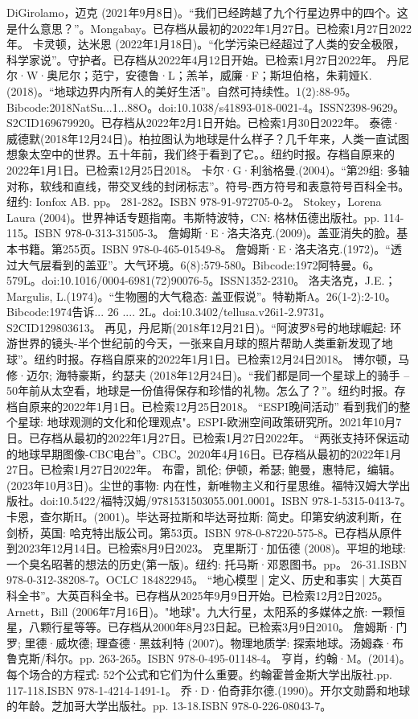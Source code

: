 \begin{enumerate}
 DiGirolamo，迈克 (2021年9月8日)。“我们已经跨越了九个行星边界中的四个。这是什么意思？”。Mongabay。已存档从最初的2022年1月27日。已检索1月27日2022年。
 卡灵顿，达米恩 (2022年1月18日)。“化学污染已经超过了人类的安全极限，科学家说”。守护者。已存档从2022年4月12日开始。已检索1月27日2022年。
 丹尼尔·W·奥尼尔；范宁，安德鲁·L；羔羊，威廉·F；斯坦伯格，朱莉娅K.(2018)。“地球边界内所有人的美好生活”。自然可持续性。1(2):88-95。Bibcode:2018NatSu...1...88O。doi:10.1038/s41893-018-0021-4。ISSN2398-9629。S2CID169679920。已存档从2022年2月1日开始。已检索1月30日2022年。  
 泰德·威德默(2018年12月24日)。柏拉图认为地球是什么样子？几千年来，人类一直试图想象太空中的世界。五十年前，我们终于看到了它。。纽约时报。存档自原来的2022年1月1日。已检索12月25日2018。
 卡尔·G·利翁格曼.(2004)。“第29组: 多轴对称，软线和直线，带交叉线的封闭标志”。符号-西方符号和表意符号百科全书。纽约: Ionfox AB. pp。 281-282。ISBN 978-91-972705-0-2。
 Stokey，Lorena Laura (2004)。世界神话专题指南。韦斯特波特，CN: 格林伍德出版社。pp. 114-115。ISBN 978-0-313-31505-3。
 詹姆斯·E·洛夫洛克.(2009)。盖亚消失的脸。基本书籍。第255页。ISBN 978-0-465-01549-8。
 詹姆斯·E·洛夫洛克.(1972)。“透过大气层看到的盖亚”。大气环境。6(8):579-580。Bibcode:1972阿特曼。6。579L。doi:10.1016/0004-6981(72)90076-5。ISSN1352-2310。 
 洛夫洛克，J.E.；Margulis, L.(1974)。“生物圈的大气稳态: 盖亚假说”。特勒斯A。26(1-2):2-10。Bibcode:1974告诉... 26 .... 2L。doi:10.3402/tellusa.v26i1-2.9731。S2CID129803613。 
 再见，丹尼斯(2018年12月21日)。“阿波罗8号的地球崛起: 环游世界的镜头-半个世纪前的今天，一张来自月球的照片帮助人类重新发现了地球”。纽约时报。存档自原来的2022年1月1日。已检索12月24日2018。
 博尔顿，马修·迈尔; 海特豪斯，约瑟夫 (2018年12月24日)。“我们都是同一个星球上的骑手 -- 50年前从太空看，地球是一份值得保存和珍惜的礼物。怎么了？”。纽约时报。存档自原来的2022年1月1日。已检索12月25日2018。
 “ESPI晚间活动” 看到我们的整个星球: 地球观测的文化和伦理观点"。ESPI-欧洲空间政策研究所。2021年10月7日。已存档从最初的2022年1月27日。已检索1月27日2022年。
 “两张支持环保运动的地球早期图像-CBC电台”。CBC。2020年4月16日。已存档从最初的2022年1月27日。已检索1月27日2022年。
 布雷，凯伦; 伊顿，希瑟; 鲍曼，惠特尼，编辑。(2023年10月3日)。尘世的事物: 内在性，新唯物主义和行星思维。福特汉姆大学出版社。doi:10.5422/福特汉姆/9781531503055.001.0001。ISBN 978-1-5315-0413-7。
 卡恩，查尔斯H。(2001)。毕达哥拉斯和毕达哥拉斯: 简史。印第安纳波利斯，在剑桥，英国: 哈克特出版公司。第53页。ISBN 978-0-87220-575-8。已存档从原件到2023年12月14日。已检索8月9日2023。
 克里斯汀·加伍德 (2008)。平坦的地球: 一个臭名昭著的想法的历史(第一版)。纽约: 托马斯·邓恩图书。pp。 26-31.ISBN 978-0-312-38208-7。OCLC 184822945。
 “地心模型 | 定义、历史和事实 | 大英百科全书”。大英百科全书。已存档从2025年9月9日开始。已检索12月2日2025。
 Arnett，Bill (2006年7月16日)。"地球"。九大行星，太阳系的多媒体之旅: 一颗恒星，八颗行星等等。已存档从2000年8月23日起。已检索3月9日2010。
 詹姆斯·门罗; 里德·威坎德; 理查德·黑兹利特 (2007)。物理地质学: 探索地球。汤姆森·布鲁克斯/科尔。pp. 263-265。ISBN 978-0-495-01148-4。
 亨肖，约翰·M。(2014)。每个场合的方程式: 52个公式和它们为什么重要。约翰霍普金斯大学出版社.pp. 117-118.ISBN 978-1-4214-1491-1。
 乔·D·伯奇菲尔德.(1990)。开尔文勋爵和地球的年龄。芝加哥大学出版社。pp. 13-18.ISBN 978-0-226-08043-7。
 \end{enumerate}